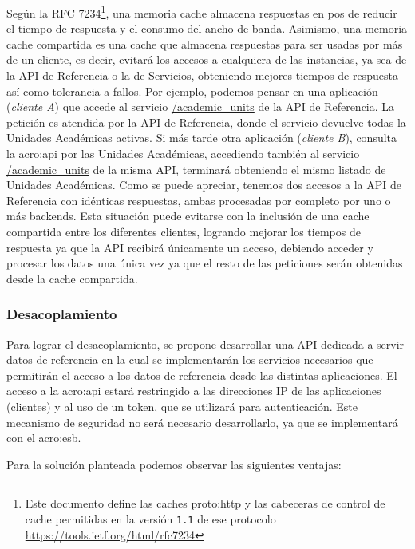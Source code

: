 Según la RFC 7234\footnote{Este documento define las caches \gls{proto:http} y las cabeceras de control de cache permitidas en la versión \texttt{1.1} de ese protocolo\\\url{https://tools.ietf.org/html/rfc7234}}, una memoria cache almacena respuestas en pos de reducir el tiempo de respuesta y el consumo del ancho de banda. Asimismo, una memoria cache compartida es una cache que almacena respuestas para ser usadas por más de un cliente, es decir, evitará los accesos a cualquiera de las instancias, ya sea de la API de Referencia o la de Servicios, obteniendo mejores tiempos de respuesta así como tolerancia a fallos. Por ejemplo, podemos pensar en una aplicación (\textit{cliente A}) que accede al servicio \url{/academic_units} de la API de Referencia. La petición es atendida por la API de Referencia, donde el servicio devuelve todas la Unidades Académicas activas. Si más tarde otra aplicación (\textit{cliente B}), consulta la \gls{acro:api} por las Unidades Académicas, accediendo también al servicio \url{/academic_units} de la misma API, terminará obteniendo el mismo listado de Unidades Académicas. Como se puede apreciar, tenemos dos accesos a la API de Referencia con idénticas respuestas, ambas procesadas por completo por uno o más backends. Esta situación puede evitarse con la inclusión de una cache compartida entre los diferentes clientes, logrando mejorar los tiempos de respuesta ya que la API recibirá únicamente un acceso, debiendo acceder y procesar los datos una única vez ya que el resto de las peticiones serán obtenidas desde la cache compartida.


\subsubsection{Desacoplamiento}


Para lograr el desacoplamiento, se propone desarrollar una API dedicada a servir datos de referencia en la cual se implementarán los servicios necesarios que permitirán el acceso a los datos de referencia desde las distintas aplicaciones. El acceso a la \gls{acro:api} estará restringido a las direcciones IP de las aplicaciones (clientes) y al uso de un token, que se utilizará para autenticación. Este mecanismo de seguridad no será necesario desarrollarlo, ya que se implementará con el \gls{acro:esb}.

Para la solución planteada podemos observar las siguientes ventajas:

